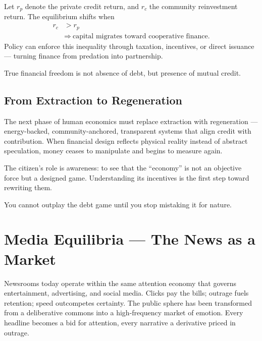 \documentclass[12pt,twoside]{book}
\begin{document}
\begin{tcolorbox}[colback=gray!5,
  colframe=gray!60,
  boxrule=0.4pt,
  arc=1mm,
  title={Mathematical Interlude: Cooperative Credit Equilibrium},
  enhanced,
  breakable,
  left=5pt,
  right=5pt,
  width=\linewidth]
\small
Let $r_p$ denote the private credit return, and $r_c$ the community reinvestment return.
The equilibrium shifts when
\[
\begin{aligned}
r_c &> r_p \\
&\Rightarrow\ \text{capital migrates toward cooperative finance.}
\end{aligned}
\]
Policy can enforce this inequality through taxation, incentives, or direct issuance — turning
finance from predation into partnership.
\end{tcolorbox}


\begin{keyidea}
True financial freedom is not absence of debt, but presence of mutual credit.
\end{keyidea}

\section{From Extraction to Regeneration}

The next phase of human economics must replace extraction with regeneration --- energy-backed, community-anchored, transparent systems that align credit with contribution.  
When financial design reflects physical reality instead of abstract speculation, money ceases to manipulate and begins to measure again.  

The citizen’s role is awareness: to see that the “economy” is not an objective force but a designed game.  
Understanding its incentives is the first step toward rewriting them. \\

\begin{keyidea}
You cannot outplay the debt game until you stop mistaking it for nature.
\end{keyidea}

\chapter{Media Equilibria — The News as a Market}

Newsrooms today operate within the same attention economy that governs entertainment, advertising, and social media.  
Clicks pay the bills; outrage fuels retention; speed outcompetes certainty.  
The public sphere has been transformed from a deliberative commons into a high-frequency market of emotion.  
Every headline becomes a bid for attention, every narrative a derivative priced in outrage.  
\end{document}

